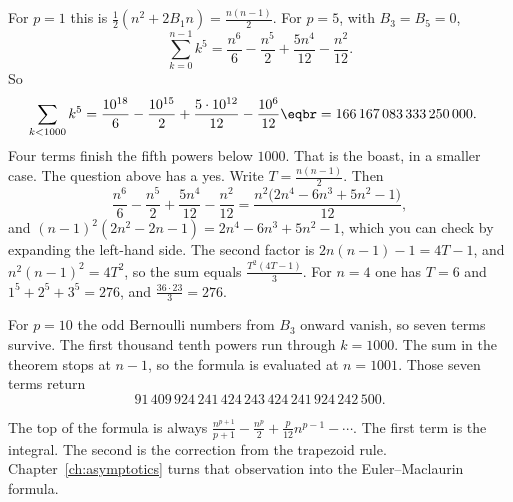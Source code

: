 For $p=1$ this is $\frac12(n^2+2B_1n)=\frac{n(n-1)}2$. For $p=5$, with $B_3=B_5=0$,
\[
\sum_{k=0}^{n-1}k^5=\frac{n^6}6-\frac{n^5}2+\frac{5n^4}{12}-\frac{n^2}{12}.
\]
So
\[
\begin{aligned}\sum_{k<1000}k^5&=\frac{10^{18}}6-\frac{10^{15}}2+\frac{5\cdot10^{12}}{12}-\frac{10^6}{12}\eqbr=166\,167\,083\,333\,250\,000.\end{aligned}
\]
Four terms finish the fifth powers below $1000$. That is the boast, in a smaller case. The question above has a yes. Write $T=\frac{n(n-1)}2$. Then
\[
\frac{n^6}6-\frac{n^5}2+\frac{5n^4}{12}-\frac{n^2}{12}=\frac{n^2\bigl(2n^4-6n^3+5n^2-1\bigr)}{12},
\]
and $(n-1)^2(2n^2-2n-1)=2n^4-6n^3+5n^2-1$, which you can check by expanding the left-hand side. The second factor is $2n(n-1)-1=4T-1$, and $n^2(n-1)^2=4T^2$, so the sum equals $\frac{T^2(4T-1)}{3}$. For $n=4$ one has $T=6$ and $1^5+2^5+3^5=276$, and $\frac{36\cdot 23}{3}=276$.

For $p=10$ the odd Bernoulli numbers from $B_3$ onward vanish, so seven terms survive. The first thousand tenth powers run through $k=1000$. The sum in the theorem stops at $n-1$, so the formula is evaluated at $n=1001$. Those seven terms return
\[
91\,409\,924\,241\,424\,243\,424\,241\,924\,242\,500.
\]

The top of the formula is always $\frac{n^{p+1}}{p+1}-\frac{n^p}2+\frac{p}{12}n^{p-1}-\cdots$. The first term is the integral. The second is the correction from the trapezoid rule. Chapter~\ref{ch:asymptotics} turns that observation into the Euler--Maclaurin formula.

